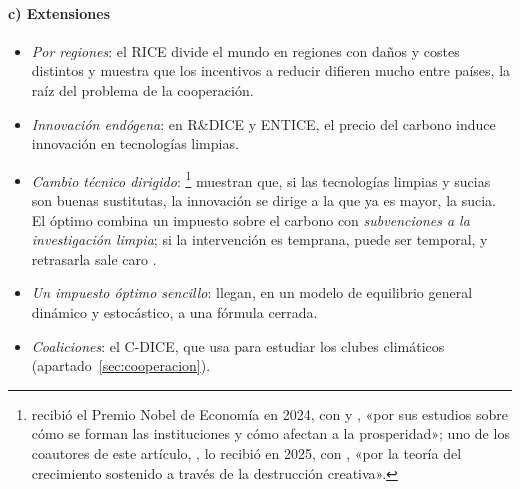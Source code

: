 \documentclass[11pt]{article}
\begin{document}
\paragraph{c) Extensiones}

\begin{itemize}
\item \emph{Por regiones}: el RICE divide el mundo en regiones con daños y costes distintos\nocite{NordhausYang1996Regional} y muestra que los incentivos a reducir difieren mucho entre países, la raíz del problema de la cooperación.
\item \emph{Innovación endógena}: en R\&DICE\nocite{Nordhaus2002Modeling} y ENTICE\nocite{Popp2004ENTICE}, el precio del carbono induce innovación en tecnologías limpias.
\item \emph{Cambio técnico dirigido}: \textcite{Acemoglu2012Environment}\footnote{ recibió el Premio Nobel de Economía en 2024, con  y , «por sus estudios sobre cómo se forman las instituciones y cómo afectan a la prosperidad»\nocite{NobelPrize2024}; uno de los coautores de este artículo, , lo recibió en 2025, con , «por la teoría del crecimiento sostenido a través de la destrucción creativa»\nocite{NobelPrize2025}.} muestran que, si las tecnologías limpias y sucias son buenas sustitutas, la innovación se dirige a la que ya es mayor, la sucia. El óptimo combina un impuesto sobre el carbono con \emph{subvenciones a la investigación limpia}; si la intervención es temprana, puede ser temporal, y retrasarla sale caro .
\item \emph{Un impuesto óptimo sencillo}: \textcite{Golosov2014Optimal} llegan, en un modelo de equilibrio general dinámico y estocástico, a una fórmula cerrada.
\item \emph{Coaliciones}: el C-DICE, que \textcite{Nordhaus2015Climate} usa para estudiar los clubes climáticos (apartado~\ref{sec:cooperacion}).
\end{itemize}
\end{document}
